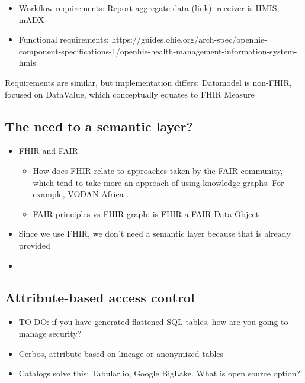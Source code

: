 \documentclass[
  authoryear]{elsarticle}
\providecommand{\tightlist}{%
  \setlength{\itemsep}{0pt}\setlength{\parskip}{0pt}}\usepackage{longtable,booktabs,array}
\begin{document}
\begin{itemize}
\tightlist
\item
  Workflow requirements: Report aggregate data (link): receiver is HMIS,
  mADX
\item
  Functional requirements:
  https://guides.ohie.org/arch-spec/openhie-component-specifications-1/openhie-health-management-information-system-hmis
\end{itemize}

Requirements are similar, but implementation differs: Datamodel is
non-FHIR, focused on DataValue, which conceptually equates to FHIR
Measure

\subsection{The need to a semantic
layer?}\label{the-need-to-a-semantic-layer}

\begin{itemize}
\tightlist
\item
  FHIR and FAIR

  \begin{itemize}
  \tightlist
  \item
    How does FHIR relate to approaches taken by the FAIR community,
    which tend to take more an approach of using knowledge graphs. For
    example, VODAN Africa
    \citep{gebreslassie2023fhir4fair, purnamajati2022data}.
  \item
    FAIR principles vs FHIR graph: is FHIR a FAIR Data Object
  \end{itemize}
\item
  Since we use FHIR, we don't need a semantic layer because that is
  already provided
\item
\end{itemize}

\subsection{Attribute-based access
control}\label{attribute-based-access-control}

\begin{itemize}
\tightlist
\item
  TO DO: if you have generated flattened SQL tables, how are you going
  to manage security?
\item
  Cerbos, attribute based on lineage or anonymized tables
\item
  Catalogs solve this: Tabular.io, Google BigLake. What is open source
  option?
\end{itemize}
\end{document}
